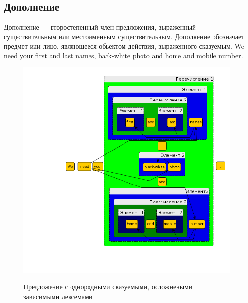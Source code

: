 \documentclass{standalone}
\begin{document}
\subsection{Дополнение} %
%
Дополнение — второстепенный член предложения, выраженный существительным или местоименным существительным. Дополнение обозначает предмет или лицо, являющееся объектом действия, выраженного сказуемым.
We need your first and last names, back-white photo and home and mobile number.
\begin{figure}[!ht]
\includegraphics[width=\textwidth]{images/sentences6.png}
\label{obstoyatelstvo}
\caption{Предложение с однородными сказуемыми, осложнеными зависимыми лексемами}
\end{figure}
\newpage
\end{document}
